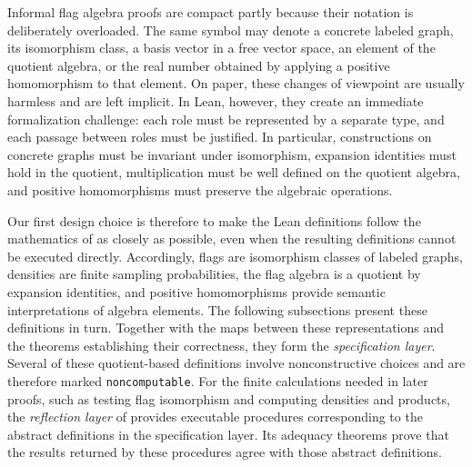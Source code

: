 \documentclass{article}
\newcommand{\lean}[1]{\texttt{#1}}
\begin{document}
Informal flag algebra proofs are compact partly because their notation is
deliberately overloaded.  The same symbol may denote a concrete labeled graph,
its isomorphism class, a basis vector in a free vector space, an element of the
quotient algebra, or the real number obtained by applying a positive
homomorphism to that element.  On paper, these changes of viewpoint are usually
harmless and are left implicit.  In Lean, however, they create an immediate
formalization challenge: each role must be represented by a separate type, and
each passage between roles must be justified.  In particular, constructions
on concrete graphs must be invariant under isomorphism, expansion identities
must hold in the quotient, multiplication must be well defined on the quotient
algebra, and positive homomorphisms must preserve the algebraic operations.

Our first design choice is therefore to make the Lean definitions follow the
mathematics of  as closely as possible, even when the
resulting definitions cannot be executed directly.  Accordingly, flags are
isomorphism classes of labeled graphs, densities are finite sampling
probabilities, the flag algebra is a quotient by expansion identities, and
positive homomorphisms provide semantic interpretations of algebra elements.
The following subsections present these definitions in turn.  Together with
the maps between these representations and the theorems establishing their
correctness, they form the \emph{specification layer}.  Several of these
quotient-based definitions involve nonconstructive choices and are therefore
marked \lean{noncomputable}.  For the finite calculations needed in later
proofs, such as testing flag isomorphism and computing densities and products,
the \emph{reflection layer} of  provides executable
procedures corresponding to the abstract definitions in the specification
layer.  Its adequacy theorems prove that the results returned by these
procedures agree with those abstract definitions.
\end{document}
